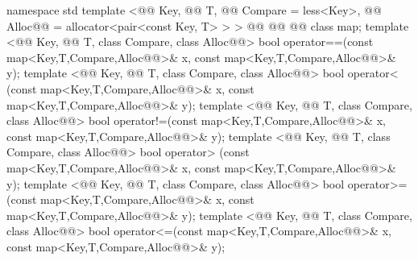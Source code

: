 \documentclass[american,twoside]{book}
\begin{document}
\begin{codeblock}
namespace std {
  template <@@ Key, @@ T, 
            @@ Compare = less<Key>,
            @@ Alloc@@ = allocator<pair<const Key, T> > >
    @@
             @@
             @@
    class map;
  template <@@ Key, @@ T, class Compare, class Alloc@@>
    bool operator==(const map<Key,T,Compare,Alloc@@>& x,
                    const map<Key,T,Compare,Alloc@@>& y);
  template <@@ Key, @@ T, class Compare, class Alloc@@>
    bool operator< (const map<Key,T,Compare,Alloc@@>& x,
                    const map<Key,T,Compare,Alloc@@>& y);
  template <@@ Key, @@ T, class Compare, class Alloc@@>
    bool operator!=(const map<Key,T,Compare,Alloc@@>& x,
                    const map<Key,T,Compare,Alloc@@>& y);
  template <@@ Key, @@ T, class Compare, class Alloc@@>
    bool operator> (const map<Key,T,Compare,Alloc@@>& x,
                    const map<Key,T,Compare,Alloc@@>& y);
  template <@@ Key, @@ T, class Compare, class Alloc@@>
    bool operator>=(const map<Key,T,Compare,Alloc@@>& x,
                    const map<Key,T,Compare,Alloc@@>& y);
  template <@@ Key, @@ T, class Compare, class Alloc@@>
    bool operator<=(const map<Key,T,Compare,Alloc@@>& x,
                    const map<Key,T,Compare,Alloc@@>& y);
}
\end{codeblock}
\end{document}

